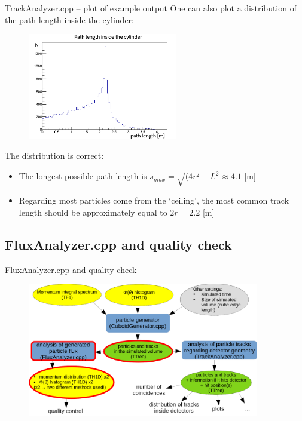 \documentclass{beamer}
\begin{document}
\begin{frame}{TrackAnalyzer.cpp -- plot of example output}
One can also plot a distribution of the path length inside the cylinder:
\begin{figure}
\includegraphics[width=0.58\textwidth]{images/track_dist.png}%
\end{figure}
The distribution is correct:
\begin{itemize}
\item The longest possible path length is $s_{max}=\sqrt{(4r^2 + L^2} \approx 4.1$ [m]
\item Regarding most particles come from the `ceiling', the most common track length should be approximately equal to $2r = 2.2$ [m]
\end{itemize}

\end{frame}

\subsection{FluxAnalyzer.cpp and quality check}

\begin{frame}{FluxAnalyzer.cpp and quality check}
\begin{figure}
\includegraphics[width=0.9\textwidth]{images/sim_scheme_flux.png}%
\end{figure}
\end{frame}
\end{document}
